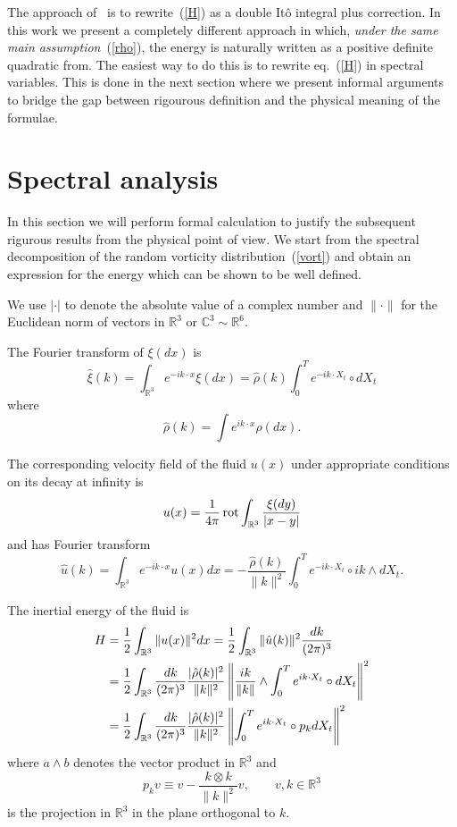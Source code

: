 The approach of~\cite{Fl2} is to rewrite~(\ref{H}) as a double It\^{o}
integral plus correction. In this work we present a completely different
approach in which, \emph{under the same main assumption}~(\ref{rho}), 
the energy is naturally written as a positive definite quadratic from. 
The easiest way to do this is to rewrite eq.~(\ref{H}) in spectral variables.
This is done in the next section where we present informal arguments to
bridge the gap between rigourous definition and the physical meaning
of the formulae.


\section{Spectral analysis}  
In this section we will perform formal calculation to justify the
subsequent rigurous results from the physical point of view. 
We start from the spectral decomposition of the random vorticity
distribution~(\ref{vort}) and obtain an expression for the energy
which can be shown to be well defined.

We use $| \cdot | $  to denote the absolute value of a complex number
and $\| \cdot \|$ for the Euclidean norm of vectors in $\mathbb{R}^3$ or
$\mathbb{C}^3 \sim \mathbb{R}^6$.

The Fourier transform of $\xi(dx)$ is
$$
\hat{\xi}(k) = \int_{\mathbb{R}^3} e^{-i k\cdot x} \xi(dx) =
\hat{\rho}(k) \int_0^T e^{-ik\cdot X_t} \circ dX_t
$$
where
$$
\hat{\rho}(k) = \int e^{ik\cdot x} \rho(dx).
$$

The corresponding velocity field of the fluid $u(x)$ under
appropriate conditions on its decay at infinity is
$$
u(x) = \frac{1}{4 \pi} \operatorname{rot} \int_{\mathbb{R}^3} \frac{\xi(dy)}{|x-y|}
$$
and has Fourier transform
$$
\hat{u}(k) = \int_{\mathbb{R}^3} e^{-i k\cdot x} u(x) dx = -
\frac{\hat{\rho}(k)}{\|k\|^2} \int_0^T e^{-ik\cdot X_t} \circ ik \wedge dX_t.
$$ 

The inertial energy of the fluid is  
\begin{equation}
\begin{split}
H & = \frac{1}{2} \int_{\mathbb{R}^3} \|u(x)\|^2 dx = \frac{1}{2} \int_{\mathbb{R}^3} 
\|\hat{u}(k)\|^2 \frac{dk}{(2\pi)^3} 
\\ & =   \frac{1}{2} \int_{\mathbb{R}^3} \frac{dk}{(2\pi)^3} \frac{|\hat{\rho}(k)|^2}{\|k\|^2} 
\left\| \frac{ik}{\|k\|} \wedge \int_0^T e^{ik\cdot X_t} \circ dX_t
\right\|^2
\\ & =   \frac{1}{2} \int_{\mathbb{R}^3} \frac{dk}{(2\pi)^3} \frac{|\hat{\rho}(k)|^2}{\|k\|^2} 
\left\| \int_0^T e^{ik\cdot X_t} \circ p_k  dX_t
\right\|^2
\end{split}
\label{eq:inertial_energy}
\end{equation}
where $a \wedge b$ denotes the vector product in $\mathbb{R}^3$ and 
$$
p_k v \equiv v - \frac{k \otimes k}{\|k\|^2} v, \qquad v,k \in \mathbb{R}^3
$$
is the projection in $\mathbb{R}^3$ in the plane orthogonal to $k$. 

